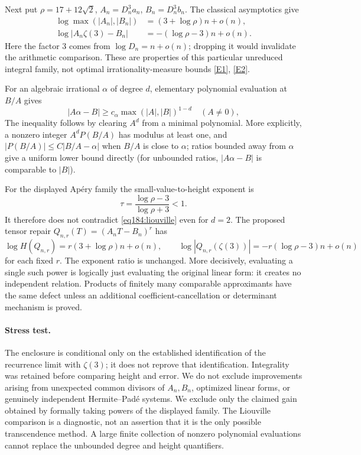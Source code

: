 \documentclass[11pt,a4paper]{article}
\newcommand{\eref}[2]{\hyperlink{extra:#1:#2}{[E#2]}}
\numberwithin{equation}{section}
\begin{document}
Next put $\rho=17+12\sqrt2$, $A_n=D_n^3a_n$, $B_n=D_n^3b_n$. The classical asymptotics give
\begin{align*}
 \log\max(|A_n|,|B_n|)&=(3+\log\rho)n+o(n),\\
 \log|A_n\zeta(3)-B_n|&=-(\log\rho-3)n+o(n).
\end{align*}
Here the factor $3$ comes from $\log D_n=n+o(n)$; dropping it would invalidate the arithmetic comparison. These are properties of this particular unreduced integral family, not optimal irrationality-measure bounds \eref{statement}{1}, \eref{statement}{2}.

For an algebraic irrational $\alpha$ of degree $d$, elementary polynomial evaluation at $B/A$ gives
\begin{equation}\label{eq184:liouville}
 |A\alpha-B|\ge c_\alpha\max(|A|,|B|)^{1-d}
 \quad(A\ne0),
\end{equation}
The inequality follows by clearing $A^d$ from a minimal polynomial. More explicitly, a nonzero integer $A^dP(B/A)$ has modulus at least one, and $|P(B/A)|\le C|B/A-\alpha|$ when $B/A$ is close to $\alpha$; ratios bounded away from $\alpha$ give a uniform lower bound directly (for unbounded ratios, $|A\alpha-B|$ is comparable to $|B|$).

For the displayed Ap\'ery family the small-value-to-height exponent is
\[
 \tau=\frac{\log\rho-3}{\log\rho+3}<1.
\]
It therefore does not contradict \eqref{eq184:liouville} even for $d=2$. The proposed tensor repair $Q_{n,r}(T)=(A_nT-B_n)^r$ has
\[
 \log H(Q_{n,r})=r(3+\log\rho)n+o(n),\qquad
 \log|Q_{n,r}(\zeta(3))|=-r(\log\rho-3)n+o(n)
\]
for each fixed $r$. The exponent ratio is unchanged. More decisively, evaluating a single such power is logically just evaluating the original linear form: it creates no independent relation. Products of finitely many comparable approximants have the same defect unless an additional coefficient-cancellation or determinant mechanism is proved.

\paragraph{Stress test.}
The enclosure is conditional only on the established identification of the recurrence limit with $\zeta(3)$; it does not reprove that identification. Integrality was retained before comparing height and error. We do not exclude improvements arising from unexpected common divisors of $A_n,B_n$, optimized linear forms, or genuinely independent Hermite--Pad\'e systems. We exclude only the claimed gain obtained by formally taking powers of the displayed family. The Liouville comparison is a diagnostic, not an assertion that it is the only possible transcendence method. A large finite collection of nonzero polynomial evaluations cannot replace the unbounded degree and height quantifiers.
\end{document}
